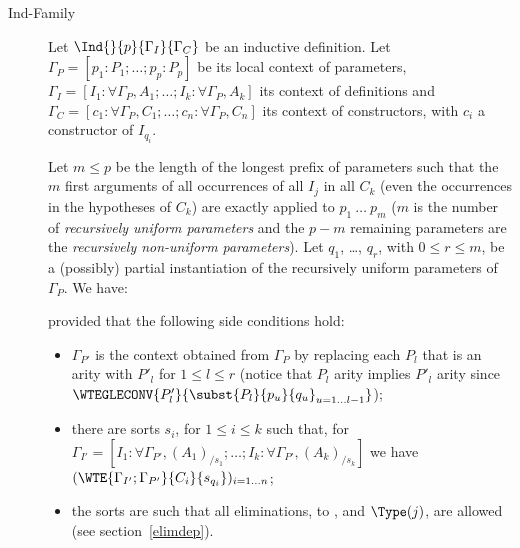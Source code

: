 \begin{description}
\item[Ind-Family] Let $\Ind{}{p}{\Gamma_I}{\Gamma_C}$ be an
  inductive definition. Let $\Gamma_P = [p_1:P_1;\ldots;p_{p}:P_{p}]$
  be its local context of parameters, $\Gamma_I = [I_1:\forall
    \Gamma_P,A_1;\ldots;I_k:\forall \Gamma_P,A_k]$ its context of
  definitions and $\Gamma_C = [c_1:\forall
    \Gamma_P,C_1;\ldots;c_n:\forall \Gamma_P,C_n]$ its context of
  constructors, with $c_i$ a constructor of $I_{q_i}$.

  Let $m \leq p$ be the length of the longest prefix of parameters
  such that the $m$ first arguments of all occurrences of all $I_j$ in
  all $C_k$ (even the occurrences in the hypotheses of $C_k$) are
  exactly applied to $p_1~\ldots~p_m$ ($m$ is the number of {\em
    recursively uniform parameters} and the $p-m$ remaining parameters
  are the {\em recursively non-uniform parameters}). Let $q_1$,
  \ldots, $q_r$, with $0\leq r\leq m$, be a (possibly) partial
  instantiation of the recursively uniform parameters of
  $\Gamma_P$. We have:


provided that the following side conditions hold:

\begin{itemize}
\item $\Gamma_{P'}$ is the context obtained from $\Gamma_P$ by
replacing each $P_l$ that is an arity with $P'_l$ for $1\leq l \leq r$ (notice that
$P_l$ arity implies $P'_l$ arity since $\WTEGLECONV{P'_l}{ \subst{P_l}{p_u}{q_u}_{u=1\ldots l-1}}$);
\item there are sorts $s_i$, for $1 \leq i \leq k$ such that, for
 $\Gamma_{I'} = [I_1:\forall
    \Gamma_{P'},(A_1)_{/s_1};\ldots;I_k:\forall \Gamma_{P'},(A_k)_{/s_k}]$
we have $(\WTE{\Gamma_{I'};\Gamma_{P'}}{C_i}{s_{q_i}})_{i=1\ldots  n}$;
\item the sorts are such that all eliminations, to {\Prop}, {\Set} and
  $\Type(j)$, are allowed (see section~\ref{elimdep}).
\end{itemize}
\end{description}

